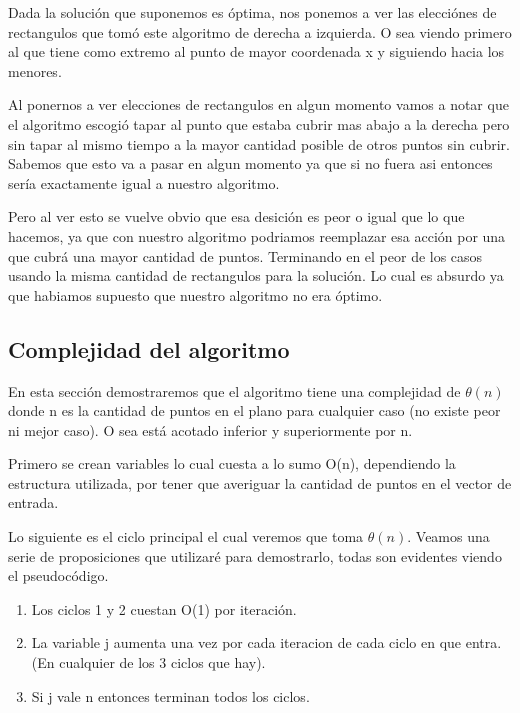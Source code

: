 Dada la solución que suponemos es óptima, nos ponemos a ver las elecciónes de rectangulos que tomó este algoritmo de derecha a izquierda. O sea viendo primero al que tiene como extremo al punto de mayor coordenada x y siguiendo hacia los menores.

Al ponernos a ver elecciones de rectangulos en algun momento vamos a notar que el algoritmo escogió tapar al punto que estaba cubrir mas abajo a la derecha pero sin tapar al mismo tiempo a la mayor cantidad posible de otros puntos sin cubrir. Sabemos que esto va a pasar en algun momento ya que si no fuera asi entonces sería exactamente igual a nuestro algoritmo.

Pero al ver esto se vuelve obvio que esa desición es peor o igual que lo que hacemos, ya que con nuestro algoritmo podriamos reemplazar esa acción por una que cubrá una mayor cantidad de puntos. Terminando en el peor de los casos usando la misma cantidad de rectangulos para la solución. Lo cual es absurdo ya que habiamos supuesto que nuestro algoritmo no era óptimo.



\subsection{Complejidad del algoritmo}

En esta sección demostraremos que el algoritmo tiene una complejidad de $\theta(n)$ donde n es la cantidad de puntos en el plano para cualquier caso (no existe peor ni mejor caso). O sea está acotado inferior y superiormente por n.

Primero se crean variables lo cual cuesta a lo sumo O(n), dependiendo la estructura utilizada, por tener que averiguar la cantidad de puntos en el vector de entrada.

Lo siguiente es el ciclo principal el cual veremos que toma $\theta(n)$. Veamos una serie de proposiciones que utilizaré para demostrarlo, todas son evidentes viendo el pseudocódigo.

\begin{enumerate}

\item Los ciclos 1 y 2 cuestan O(1) por iteración.

\item La variable j aumenta una vez por cada iteracion de cada ciclo en que entra. (En cualquier de los 3 ciclos que hay).

\item Si j vale n entonces terminan todos los ciclos.

\end{enumerate}

